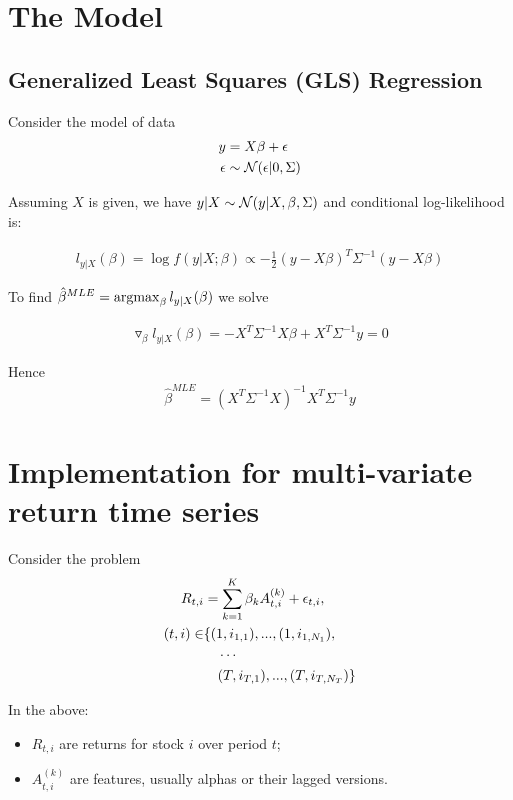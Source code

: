 \section{The Model}
\subsection{Generalized Least Squares (GLS) Regression}
Consider the model of data
\begin{align}
	y &= X \beta + \epsilon  \\
	\epsilon &\sim \mathcal{N}(\epsilon| 0, \Sigma) \nonumber
\end{align}

Assuming $X$ is given, we have $y|X \sim \mathcal{N}(y| X, \beta, \Sigma)$ and conditional log-likelihood is:

\begin{align*}
	l_{y|X}(\beta) = \log f(y|X; \beta) \propto -\frac{1}{2} (y - X\beta)^T \Sigma^{-1} (y - X \beta)
\end{align*}

To find $\hat{\beta}^{MLE} = \operatorname*{argmax}_\beta  l_{y|X}(\beta)$ we solve


\begin{align*}
	\triangledown_{\beta} l_{y|X}(\beta) = - X^T \Sigma^{-1} X \beta + X^T \Sigma^{-1} y = 0
\end{align*}

Hence
\begin{align}
	\label{eq:beta_mle}
	\hat{\beta}^{MLE} = (X^T \Sigma^{-1} X)^{-1} X^T \Sigma^{-1} y
\end{align}


\section{Implementation for multi-variate return time series}
Consider the problem 
\begin{align}\label{eq:return_alpha}
	R_{t,i} &= \sum_{k=1}^K \beta_k A^{(k)}_{t,i} + \epsilon_{t,i}, \\
	(t,i) \in &\{(1, i_{1,1}),...,(1, i_{1, N_1}),\notag\\
	&\phantom{\in\ }\cdots\notag\\
	&\phantom{\in\ }(T, i_{T,1}),...,(T, i_{T, N_T})\} \notag
\end{align}

In the above:
\begin{itemize}
	\item $R_{t,i}$ are returns for stock $i$ over period $t$;
	\item $A^{(k)}_{t,i}$ are features, usually alphas or their lagged versions.
\end{itemize} 

